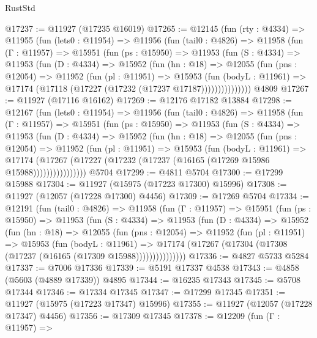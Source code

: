 \begin{lexlean}{RustStd}
\begin{coremodule}
@17237 := @11927 (@17235 @16019)
@17265 := @12145
    (fun (rty : @4334) =>
    @11955
      (fun (lets0 : @11954) =>
      @11956
        (fun (tail0 : @4826) =>
        @11958
          (fun (Γ : @11957) =>
          @15951
            (fun (ps : @15950) =>
            @11953
              (fun (S : @4334) =>
              @11953
                (fun (D : @4334) =>
                @15952
                  (fun (hn : @18) =>
                  @12055
                    (fun (pns : @12054) =>
                    @11952
                      (fun (pl : @11951) =>
                      @15953
                        (fun (bodyL : @11961) =>
                        @17174 (@17118 (@17227 (@17232 (@17237 @17187)))))))))))))))
    @4809
@17267 := @11927 (@17116 @16162)
@17269 := @12176 @17182 @13884
@17298 := @12167
    (fun (lets0 : @11954) =>
    @11956
      (fun (tail0 : @4826) =>
      @11958
        (fun (Γ : @11957) =>
        @15951
          (fun (ps : @15950) =>
          @11953
            (fun (S : @4334) =>
            @11953
              (fun (D : @4334) =>
              @15952
                (fun (hn : @18) =>
                @12055
                  (fun (pns : @12054) =>
                  @11952
                    (fun (pl : @11951) =>
                    @15953
                      (fun (bodyL : @11961) =>
                      @17174
                        (@17267
                          (@17227 (@17232 (@17237 (@16165 (@17269 @15986 @15988))))))))))))))))
    @5704
@17299 := @4811 @5704
@17300 := @17299 @15988
@17304 := @11927 (@15975 (@17223 @17300) @15996)
@17308 := @11927 (@12057 (@17228 @17300) @4456)
@17309 := @17269 @5704
@17334 := @12191
    (fun (tail0 : @4826) =>
    @11958
      (fun (Γ : @11957) =>
      @15951
        (fun (ps : @15950) =>
        @11953
          (fun (S : @4334) =>
          @11953
            (fun (D : @4334) =>
            @15952
              (fun (hn : @18) =>
              @12055
                (fun (pns : @12054) =>
                @11952
                  (fun (pl : @11951) =>
                  @15953
                    (fun (bodyL : @11961) =>
                    @17174 (@17267 (@17304 (@17308 (@17237 (@16165 (@17309 @15988)))))))))))))))
@17336 := @4827 @5733 @5284
@17337 := @7006 @17336
@17339 := @5191 @17337 @4538
@17343 := @4858 (@5603 (@4889 @17339)) @4895
@17344 := @16235 @17343
@17345 := @5708 @17344
@17346 := @17334 @17345
@17347 := @17299 @17345
@17351 := @11927 (@15975 (@17223 @17347) @15996)
@17355 := @11927 (@12057 (@17228 @17347) @4456)
@17356 := @17309 @17345
@17378 := @12209
    (fun (Γ : @11957) =>

\end{coremodule}
\end{lexlean}
